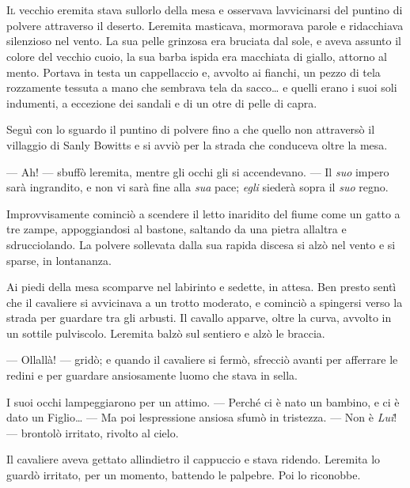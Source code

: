	\chapter{\phantom{title}}

\lettrine{I}{l} vecchio eremita stava sull\textquotesingle orlo della mesa e
osservava l\textquotesingle avvicinarsi del puntino di polvere
attraverso il deserto. L\textquotesingle eremita masticava, mormorava
parole e ridacchiava silenzioso nel vento. La sua pelle grinzosa era
bruciata dal sole, e aveva assunto il colore del vecchio cuoio, la sua
barba ispida era macchiata di giallo, attorno al mento. Portava in testa
un cappellaccio e, avvolto ai fianchi, un pezzo di tela rozzamente
tessuta a mano che sembrava tela da sacco\ldots{} e quelli erano i suoi
soli indumenti, a eccezione dei sandali e di un otre di pelle di capra.

Seguì con lo sguardo il puntino di polvere fino a che quello non
attraversò il villaggio di Sanly Bowitts e si avviò per la strada che
conduceva oltre la mesa.

--- Ah! --- sbuffò l\textquotesingle eremita, mentre gli occhi gli si
accendevano. --- Il \emph{suo} impero sarà ingrandito, e non vi sarà
fine alla \emph{sua} pace; \emph{egli} siederà sopra il \emph{suo}
regno.

Improvvisamente cominciò a scendere il letto inaridito del fiume come un
gatto a tre zampe, appoggiandosi al bastone, saltando da una pietra
all\textquotesingle altra e sdrucciolando. La polvere sollevata dalla
sua rapida discesa si alzò nel vento e si sparse, in lontananza.

Ai piedi della mesa scomparve nel labirinto e sedette, in attesa. Ben
presto sentì che il cavaliere si avvicinava a un trotto moderato, e
cominciò a spingersi verso la strada per guardare tra gli arbusti. Il
cavallo apparve, oltre la curva, avvolto in un sottile pulviscolo.
L\textquotesingle eremita balzò sul sentiero e alzò le braccia.

--- Ollallà! --- gridò; e quando il cavaliere si fermò, sfrecciò avanti
per afferrare le redini e per guardare ansiosamente
l\textquotesingle uomo che stava in sella.

I suoi occhi lampeggiarono per un attimo. --- Perché ci è nato un
bambino, e ci è dato un Figlio\ldots{} --- Ma poi
l\textquotesingle espressione ansiosa sfumò in tristezza. --- Non è
\emph{Lui}! --- brontolò irritato, rivolto al cielo.

Il cavaliere aveva gettato all\textquotesingle indietro il cappuccio e
stava ridendo. L\textquotesingle eremita lo guardò irritato, per un
momento, battendo le palpebre. Poi lo riconobbe.

